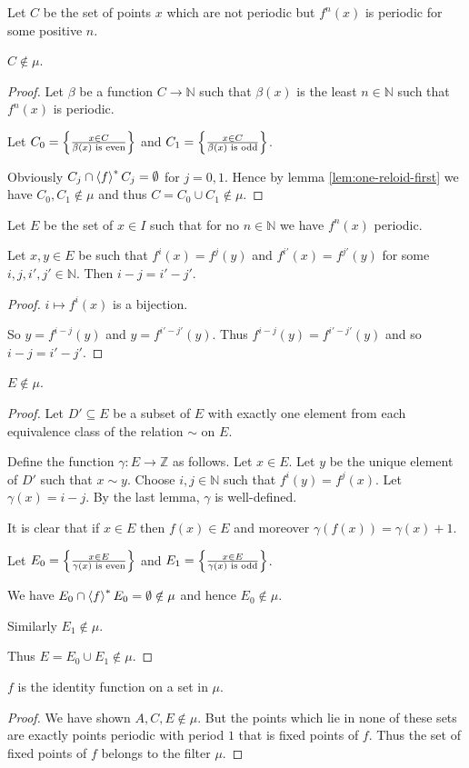 Let $C$ be the set of points $x$ which are not periodic but $f^{n}(x)$
is periodic for some positive $n$.
\begin{lem}
$C\notin\mu$.\end{lem}
\begin{proof}
Let $\beta$ be a function $C\rightarrow\mathbb{N}$ such that $\beta(x)$
is the least $n\in\mathbb{N}$ such that $f^{n}(x)$ is periodic.

Let $C_{0}=\left\{ \frac{x\in C}{\beta(x)\text{ is even}}\right\}$ and $C_{1}=\left\{ \frac{x\in C}{\beta(x)\text{ is odd}}\right\}$.

Obviously $C_{j}\cap\left\langle f\right\rangle ^{\ast}C_{j}=\emptyset$ for $j=0,1$. Hence
by lemma \ref{lem:one-reloid-first} we have $C_{0},C_{1}\notin\mu$
and thus $C=C_{0}\cup C_{1}\notin\mu$.
\end{proof}
Let $E$ be the set of $x\in I$ such that for no $n\in\mathbb{N}$
we have $f^{n}(x)$ periodic.
\begin{lem}
Let $x,y\in E$ be such that $f^{i}(x)=f^{j}(y)$ and $f^{i'}(x)=f^{j'}(y)$
for some $i,j,i',j'\in\mathbb{N}$. Then $i-j=i'-j'$.\end{lem}
\begin{proof}
$i\mapsto f^{i}(x)$ is a bijection.

So $y=f^{i-j}(y)$ and $y=f^{i'-j'}(y)$. Thus $f^{i-j}(y)=f^{i'-j'}(y)$
and so $i-j=i'-j'$.\end{proof}
\begin{lem}
$E\notin\mu$.\end{lem}
\begin{proof}
Let $D'\subseteq E$ be a subset of $E$ with exactly one element
from each equivalence class of the relation $\sim$ on $E$.

Define the function $\gamma:E\rightarrow\mathbb{Z}$ as follows. Let
$x\in E$. Let $y$ be the unique element of $D'$ such that $x\sim y$.
Choose $i,j\in\mathbb{N}$ such that $f^{i}(y)=f^{j}(x)$. Let $\gamma(x)=i-j$.
By the last lemma, $\gamma$ is well-defined.

It is clear that if $x\in E$ then $f(x)\in E$ and moreover $\gamma(f(x))=\gamma(x)+1$.

Let $E_{0}=\left\{ \frac{x\in E}{\gamma(x)\text{ is even}}\right\}$ and $E_{1}=\left\{ \frac{x\in E}{\gamma(x)\text{ is odd}}\right\}$.

We have $E_{0}\cap\left\langle f\right\rangle ^{\ast}E_{0}=\emptyset\notin\mu$ and hence $E_{0}\notin\mu$.

Similarly $E_{1}\notin\mu$.

Thus $E=E_{0}\cup E_{1}\notin\mu$.\end{proof}
\begin{lem}
$f$ is the identity function on a set in $\mu$.\end{lem}
\begin{proof}
We have shown $A,C,E\notin\mu$. But the points which lie in none
of these sets are exactly points periodic with period $1$ that is
fixed points of $f$. Thus the set of fixed points of $f$ belongs
to the filter $\mu$.
\end{proof}

